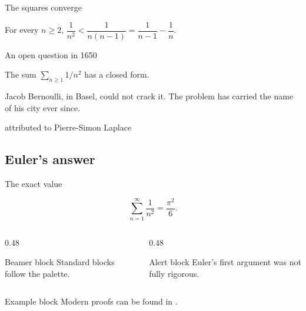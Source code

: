 \documentclass[night,charter,footer]{BeamerJS}
\begin{document}
\begin{frame}{The squares converge}
	\begin{lemma}
		For every $n\geq2$, $\dfrac{1}{n^2}<\dfrac{1}{n(n-1)}
		=\dfrac{1}{n-1}-\dfrac{1}{n}$.
	\end{lemma}


\end{frame}

\begin{frame}{An open question in 1650}
	\begin{conj}[Mengoli, 1650]
		The sum $\sum_{n\geq1}1/n^2$ has a closed form.
	\end{conj}

	Jacob Bernoulli, in Basel, could not crack it. The problem has carried
	the name of his city ever since.

		{attributed to Pierre-Simon Laplace}
\end{frame}

\subsection{Euler's answer}

\begin{frame}{The exact value}
	\begin{thm}
		\[
			\sum_{n=1}^{\infty}\frac{1}{n^2}=\frac{\pi^2}{6}.
		\]
	\end{thm}

	\begin{columns}[T,onlytextwidth]
		\begin{column}{0.48\linewidth}
			\begin{block}{Beamer block}
				Standard blocks follow the palette.
			\end{block}
		\end{column}
		\begin{column}{0.48\linewidth}
			\begin{alertblock}{Alert block}
				Euler's first argument was not fully rigorous.
			\end{alertblock}
		\end{column}
	\end{columns}

	\begin{exampleblock}{Example block}
		Modern proofs can be found in \cite{aigner2018}.
	\end{exampleblock}
\end{frame}
\end{document}
